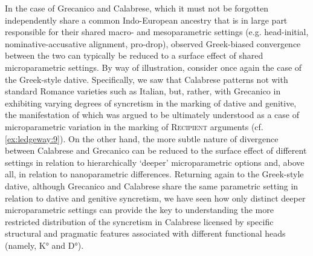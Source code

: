 \documentclass[output=paper,modfonts,nonflat]{langsci/langscibook}
\begin{document}
In the case of Grecanico and Calabrese, which it must not be forgotten independently share a common Indo-European ancestry that is in large part responsible for their shared macro- and mesoparametric settings (e.g. head-initial, nominative-accusative alignment, pro-drop), observed Greek-biased convergence between the two can typically be reduced to a surface effect of shared microparametric settings. By way of illustration, consider once again the case of the Greek-style dative. Specifically, we saw that Calabrese patterns not with standard Romance varieties such as Italian, but, rather, with Grecanico in exhibiting varying degrees of syncretism in the marking of dative and genitive, the manifestation of which was argued to be ultimately understood as a case of microparametric variation in the marking of \textsc{Recipient} arguments (cf. \ref{ex:ledgeway:9}). On the other hand, the more subtle nature of divergence between Calabrese and Grecanico can be reduced to the surface effect of different settings in relation to hierarchically `deeper' microparametric options and, above all, in relation to nanoparametric differences. Returning again to the Greek-style dative, although Grecanico and Calabrese share the same parametric setting in relation to dative and genitive syncretism, we have seen how only distinct deeper microparametric settings can provide the key to understanding the more restricted distribution of the syncretism in Calabrese licensed by specific structural and pragmatic features associated with different functional heads (namely, K° and D°).
\end{document}
